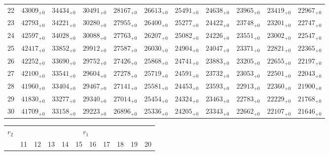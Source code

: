 \documentclass[10pt, a4paper]{article}
\begin{document}
\begin{center}
\begin{tabular}{c || c c c c c | c c c c c}
        22 & \({43009}_{+0}\) & \({34434}_{+0}\) & \({30491}_{+0}\) & \({28167}_{+0}\) & \({26613}_{+0}\) & \({25491}_{+0}\) & \({24638}_{+0}\) & \({23965}_{+0}\) & \({23419}_{+0}\) & \({22967}_{+0}\)\\
        23 & \({42793}_{+0}\) & \({34221}_{+0}\) & \({30280}_{+0}\) & \({27955}_{+0}\) & \({26400}_{+0}\) & \({25277}_{+0}\) & \({24422}_{+0}\) & \({23748}_{+0}\) & \({23201}_{+0}\) & \({22747}_{+0}\)\\
        24 & \({42597}_{+0}\) & \({34028}_{+0}\) & \({30088}_{+0}\) & \({27763}_{+0}\) & \({26207}_{+0}\) & \({25082}_{+0}\) & \({24226}_{+0}\) & \({23551}_{+0}\) & \({23002}_{+0}\) & \({22547}_{+0}\)\\
        25 & \({42417}_{+0}\) & \({33852}_{+0}\) & \({29912}_{+0}\) & \({27587}_{+0}\) & \({26030}_{+0}\) & \({24904}_{+0}\) & \({24047}_{+0}\) & \({23371}_{+0}\) & \({22821}_{+0}\) & \({22365}_{+0}\)\\
        \hline
        26 & \({42252}_{+0}\) & \({33690}_{+0}\) & \({29752}_{+0}\) & \({27426}_{+0}\) & \({25868}_{+0}\) & \({24741}_{+0}\) & \({23883}_{+0}\) & \({23205}_{+0}\) & \({22655}_{+0}\) & \({22197}_{+0}\)\\
        27 & \({42100}_{+0}\) & \({33541}_{+0}\) & \({29604}_{+0}\) & \({27278}_{+0}\) & \({25719}_{+0}\) & \({24591}_{+0}\) & \({23732}_{+0}\) & \({23053}_{+0}\) & \({22501}_{+0}\) & \({22043}_{+0}\)\\
        28 & \({41960}_{+0}\) & \({33404}_{+0}\) & \({29467}_{+0}\) & \({27141}_{+0}\) & \({25581}_{+0}\) & \({24453}_{+0}\) & \({23593}_{+0}\) & \({22913}_{+0}\) & \({22360}_{+0}\) & \({21900}_{+0}\)\\
        29 & \({41830}_{+0}\) & \({33277}_{+0}\) & \({29340}_{+0}\) & \({27014}_{+0}\) & \({25454}_{+0}\) & \({24324}_{+0}\) & \({23463}_{+0}\) & \({22783}_{+0}\) & \({22229}_{+0}\) & \({21768}_{+0}\)\\
        30 & \({41709}_{+0}\) & \({33158}_{+0}\) & \({29223}_{+0}\) & \({26896}_{+0}\) & \({25336}_{+0}\) & \({24205}_{+0}\) & \({23343}_{+0}\) & \({22662}_{+0}\) & \({22107}_{+0}\) & \({21646}_{+0}\)\\
        \hline
    \end{tabular}
    \pagebreak
    \begin{tabular}{c || c c c c c | c c c c c}
        \multirow{2}{*}{\(r_2\)} & \multicolumn{10}{c}{\(r_1\)} \\
        & 11 & 12 & 13 & 14 & 15 & 16 & 17 & 18 & 19 & 20\\
        \hline\hline

\end{tabular}
\end{center}
\end{document}
